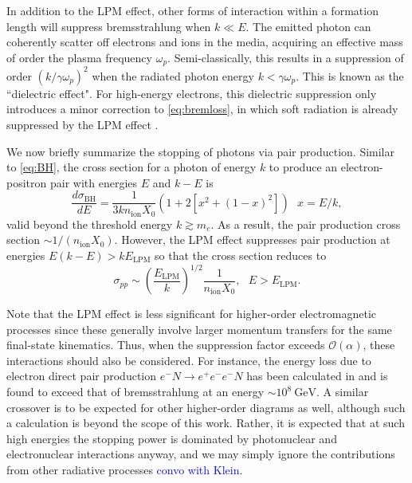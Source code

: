 \documentclass[twocolumn,showpacs,preprintnumbers,amsmath,amssymb,prd]{revtex4}
\newcommand{\OO}{\mathcal{O}}
\newcommand{\GeV}{\text{GeV}}
\def\r{\right)}
\def\l{\left(}
\begin{document}
\begin{appendices}
In addition to the LPM effect, other forms of interaction within a formation length will suppress bremsstrahlung when $k \ll E$.
The emitted photon can coherently scatter off electrons and ions in the media, acquiring an effective mass of order the plasma frequency $\omega_p$.
Semi-classically, this results in a suppression of order $(k/\gamma \omega_p)^2$ when the radiated photon energy $k < \gamma \omega_p$.
This is known as the ``dielectric effect".
For high-energy electrons, this dielectric suppression only introduces a minor correction to \eqref{eq:bremloss}, in which soft radiation is already suppressed by the LPM effect \cite{Klein:1998du}.

We now briefly summarize the stopping of photons via pair production. Similar to \eqref{eq:BH}, the cross section for a photon of energy $k$ to produce an electron-positron pair with energies $E$ and $k-E$ is
\begin{equation}
\label{eq:PP}
\frac{d \sigma_\text{BH}}{dE} = \frac{1}{3 k n_\text{ion} X_0} (1+ 2[x^2+ (1-x)^2]) ~~~ x = E/k,
\end{equation}
valid beyond the threshold energy $k \gtrsim m_e$. 
As a result, the pair production cross section $\sim 1/(n_\text{ion} X_0)$.
However, the LPM effect suppresses pair production at energies $E(k-E) > k E_\text{LPM}$ so that the cross section reduces to
\begin{equation}
\sigma_{pp} \sim \l\frac{E_\text{LPM}}{k} \r^{1/2} \frac{1}{n_\text{ion} X_0}, ~~~ E>E_\text{LPM}.
\end{equation}

Note that the LPM effect is less significant for higher-order electromagnetic processes since these generally involve larger momentum transfers for the same final-state kinematics.
Thus, when the suppression factor exceeds $\OO(\alpha)$, these interactions should also be considered.
For instance, the energy loss due to electron direct pair production $e^-N \to e^+ e^- e^- N$ has been calculated in \cite{Gerhardt:2010bj} and is found to exceed that of bremsstrahlung at an energy $\sim 10^{8} ~\GeV$. 
A similar crossover is to be expected for other higher-order diagrams as well, although such a calculation is beyond the scope of this work. 
Rather, it is expected that at such high energies the stopping power is dominated by photonuclear and electronuclear interactions anyway, and we may simply ignore the contributions from other radiative processes \textcolor{blue}{convo with Klein}. 


\end{appendices}
\end{document}
